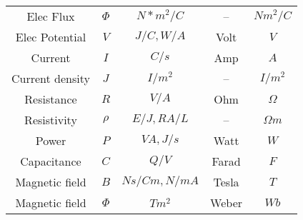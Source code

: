 \documentclass{article}
\begin{document}
\begin{large}
\begin{tabular}{ c c c c c }
Elec Flux 		& $\Phi$ 		& $N*m^2/C$ 	& -- 			& $Nm^2/C$ \\
Elec Potential	& $V$ 		& $J/C, W/A$	& Volt		& $V$ \\
Current		& $I$			& $C/s$		& Amp		& $A$ \\
Current density	& $J$		& $I/m^2$		& --			& $I/m^2$ \\
Resistance		& $R$		& $V/A$		& Ohm		& $\Omega$ \\
Resistivity		& $\rho$		& $E/J, RA/L$	& -- 			& $\Omega m$ \\
Power		& $P$		& $VA, J/s$	& Watt		& $W$ \\
Capacitance 	& $C$		& $Q/V$		& Farad		& $F$ \\
Magnetic field	& $B$		& $Ns/Cm,N/mA$	& Tesla	& $T$ \\
Magnetic field	& $\Phi$		& $Tm^2$		& Weber		& $Wb$ \\


\end{tabular}
\end{large}
\end{document}
